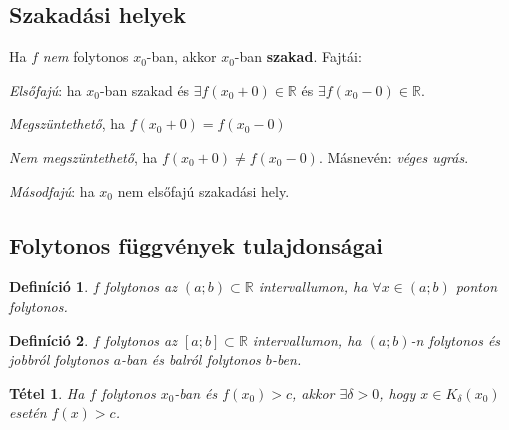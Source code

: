 \documentclass[a4paper,12pt,twoside]{book}
\newtheorem{tetel}{Tétel}[chapter]
\newtheorem{defi}{Definíció}[chapter]
\theoremstyle{break}
\theoremstyle{plain}
\begin{document}
\subsection{Szakadási helyek}

Ha $f$ \emph{nem} folytonos $x_0$-ban, akkor $x_0$-ban \textbf{szakad}. Fajtái:
\begin{enumerate*}
 \item \emph{Elsőfajú}: ha $x_0$-ban szakad és $\exists f(x_0+0)\in\mathbb{R}$ és $\exists f(x_0-0)\in\mathbb{R}$.
    \begin{enumerate*}
     \item \emph{Megszüntethető}, ha $f(x_0+0) = f(x_0-0)$
     \item \emph{Nem megszüntethető}, ha $f(x_0+0) \neq f(x_0-0)$. Másnevén: \emph{véges ugrás}.
    \end{enumerate*}
 \item \emph{Másodfajú}: ha $x_0$ nem elsőfajú szakadási hely.
\end{enumerate*}

\subsection{Folytonos függvények tulajdonságai}

\begin{defi}
 $f$ folytonos az $(a;b)\subset \mathbb{R}$ intervallumon, ha $\forall x\in(a;b)$ ponton folytonos.
\end{defi}

\begin{defi}
 $f$ folytonos az $[a;b]\subset \mathbb{R}$ intervallumon, ha $(a;b)$-n folytonos és jobbról folytonos $a$-ban és balról folytonos $b$-ben.
\end{defi}

\begin{tetel}
 Ha $f$ folytonos $x_0$-ban és $f(x_0)>c$, akkor $\exists \delta>0$, hogy $x\in K_{\delta}(x_0)$ esetén $f(x)>c$.
\end{tetel}
\end{document}
